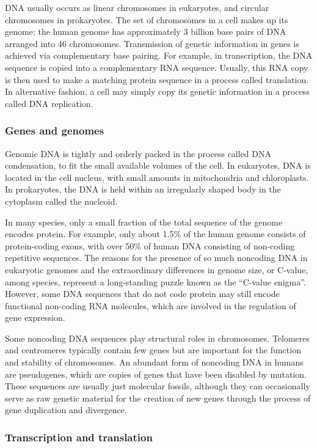 DNA usually occurs as linear chromosomes in eukaryotes, and circular chromosomes in prokaryotes. The set of chromosomes in a cell makes up its genome; the human genome has approximately 3 billion base pairs of DNA arranged into 46 chromosomes. Transmission of genetic information in genes is achieved via complementary base pairing. For example, in transcription, the DNA sequence is copied into a complementary RNA sequence. Usually, this RNA copy is then used to make a matching protein sequence in a process called translation. In alternative fashion, a cell may simply copy its genetic information in a process called DNA replication.

\hypertarget{genes-and-genomes}{%
\subsubsection{Genes and genomes}\label{genes-and-genomes}}

Genomic DNA is tightly and orderly packed in the process called DNA condensation, to fit the small available volumes of the cell. In eukaryotes, DNA is located in the cell nucleus, with small amounts in mitochondria and chloroplasts. In prokaryotes, the DNA is held within an irregularly shaped body in the cytoplasm called the nucleoid.

In many species, only a small fraction of the total sequence of the genome encodes protein. For example, only about 1.5\% of the human genome consists of protein-coding exons, with over 50\% of human DNA consisting of non-coding repetitive sequences. The reasons for the presence of so much noncoding DNA in eukaryotic genomes and the extraordinary differences in genome size, or C-value, among species, represent a long-standing puzzle known as the ``C-value enigma''. However, some DNA sequences that do not code protein may still encode functional non-coding RNA molecules, which are involved in the regulation of gene expression.

Some noncoding DNA sequences play structural roles in chromosomes. Telomeres and centromeres typically contain few genes but are important for the function and stability of chromosomes. An abundant form of noncoding DNA in humans are pseudogenes, which are copies of genes that have been disabled by mutation. These sequences are usually just molecular fossils, although they can occasionally serve as raw genetic material for the creation of new genes through the process of gene duplication and divergence.

\hypertarget{transcription-and-translation}{%
\subsubsection{Transcription and translation}\label{transcription-and-translation}}

